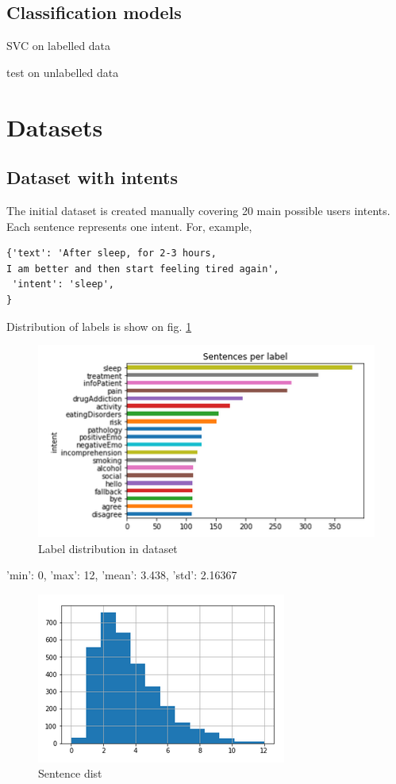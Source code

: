 \documentclass[11pt]{article}
\begin{document}
\subsection{Classification models}

SVC on labelled data

test on unlabelled data

\section{Datasets}

\subsection{Dataset with intents}

The initial dataset is created manually covering 20 main possible users intents. Each sentence represents one intent. For, example,

\begin{lstlisting}
{'text': 'After sleep, for 2-3 hours, 
I am better and then start feeling tired again',
 'intent': 'sleep',
}
\end{lstlisting}

Distribution of labels is show on fig. \ref{figure:name}

 \begin{figure}[h]
 	\centering
 	\includegraphics[scale=0.5]{report1.png}
	\caption{Label distribution in dataset}
 \label{figure:name}
 \end{figure}


{'min': 0, 'max': 12, 'mean': 3.438, 'std': 2.16367}

 \begin{figure}[h]
 	\centering
 	\includegraphics[scale=0.4]{report4.png}
	\caption{Sentence dist}
 \label{words_freq}
 \end{figure}
\end{document}

